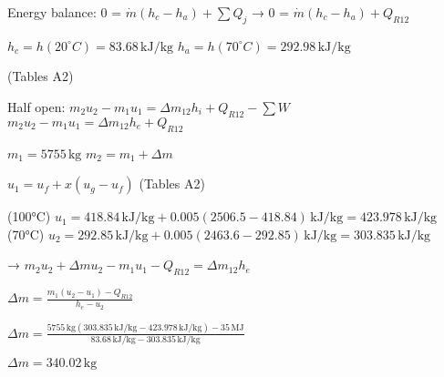 Energy balance:  
0 = \( \dot{m} (h_c - h_a) + \sum Q_j \) → 0 = \( \dot{m} (h_c - h_a) + Q_{R12} \)  

\( h_c = h(20^\circ C) = 83.68 \, \text{kJ/kg} \)  
\( h_a = h(70^\circ C) = 292.98 \, \text{kJ/kg} \)  

(Tables A2)  

Half open:  
\( m_2 u_2 - m_1 u_1 = \Delta m_{12} h_i + Q_{R12} - \sum W \)  
\( m_2 u_2 - m_1 u_1 = \Delta m_{12} h_e + Q_{R12} \)  

\( m_1 = 5755 \, \text{kg} \)  
\( m_2 = m_1 + \Delta m \)  

\( u_1 = u_f + x (u_g - u_f) \) (Tables A2)  

(100°C) \( u_1 = 418.84 \, \text{kJ/kg} + 0.005 (2506.5 - 418.84) \, \text{kJ/kg} = 423.978 \, \text{kJ/kg} \)  
(70°C) \( u_2 = 292.85 \, \text{kJ/kg} + 0.005 (2463.6 - 292.85) \, \text{kJ/kg} = 303.835 \, \text{kJ/kg} \)  

→ \( m_2 u_2 + \Delta m u_2 - m_1 u_1 - Q_{R12} = \Delta m_{12} h_e \)  

\( \Delta m = \frac{m_1 (u_2 - u_1) - Q_{R12}}{h_e - u_2} \)  

\( \Delta m = \frac{5755 \, \text{kg} (303.835 \, \text{kJ/kg} - 423.978 \, \text{kJ/kg}) - 35 \, \text{MJ}}{83.68 \, \text{kJ/kg} - 303.835 \, \text{kJ/kg}} \)  

\( \Delta m = 340.02 \, \text{kg} \)